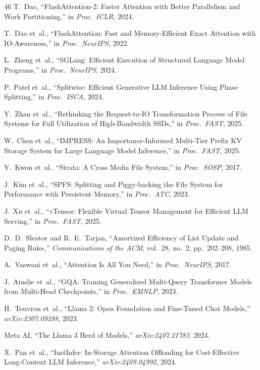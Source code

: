 \documentclass[conference]{IEEEtran}
\begin{document}
\begin{thebibliography}{46}
 T.~Dao, ``FlashAttention-2: Faster Attention with Better Parallelism and Work Partitioning,'' in \textit{Proc.\ ICLR}, 2024.

 T.~Dao et~al., ``FlashAttention: Fast and Memory-Efficient Exact Attention with IO-Awareness,'' in \textit{Proc.\ NeurIPS}, 2022.

 L.~Zheng et~al., ``SGLang: Efficient Execution of Structured Language Model Programs,'' in \textit{Proc.\ NeurIPS}, 2024.

 P.~Patel et~al., ``Splitwise: Efficient Generative LLM Inference Using Phase Splitting,'' in \textit{Proc.\ ISCA}, 2024.

 Y.~Zhan et~al., ``Rethinking the Request-to-IO Transformation Process of File Systems for Full Utilization of High-Bandwidth SSDs,'' in \textit{Proc.\ FAST}, 2025.

 W.~Chen et~al., ``IMPRESS: An Importance-Informed Multi-Tier Prefix KV Storage System for Large Language Model Inference,'' in \textit{Proc.\ FAST}, 2025.

 Y.~Kwon et~al., ``Strata: A Cross Media File System,'' in \textit{Proc.\ SOSP}, 2017.

 J.~Kim et~al., ``SPFS: Splitting and Piggy-backing the File System for Performance with Persistent Memory,'' in \textit{Proc.\ ATC}, 2023.

 J.~Xu et~al., ``vTensor: Flexible Virtual Tensor Management for Efficient LLM Serving,'' in \textit{Proc.\ FAST}, 2025.

 D.~D.~Sleator and R.~E.~Tarjan, ``Amortized Efficiency of List Update and Paging Rules,'' \textit{Communications of the ACM}, vol.~28, no.~2, pp.~202--208, 1985.

 A.~Vaswani et~al., ``Attention Is All You Need,'' in \textit{Proc.\ NeurIPS}, 2017.

 J.~Ainslie et~al., ``GQA: Training Generalized Multi-Query Transformer Models from Multi-Head Checkpoints,'' in \textit{Proc.\ EMNLP}, 2023.

 H.~Touvron et~al., ``Llama 2: Open Foundation and Fine-Tuned Chat Models,'' \textit{arXiv:2307.09288}, 2023.

 Meta AI, ``The Llama 3 Herd of Models,'' \textit{arXiv:2407.21783}, 2024.

 X.~Pan et~al., ``InstInfer: In-Storage Attention Offloading for Cost-Effective Long-Context LLM Inference,'' \textit{arXiv:2409.04992}, 2024.


\end{thebibliography}
\end{document}
